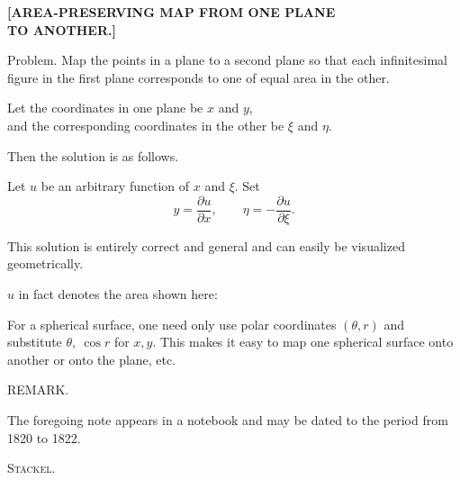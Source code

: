 \clearpage
{}%
\begin{center}\large\bfseries [AREA-PRESERVING MAP FROM ONE PLANE\\ TO ANOTHER.]\end{center}

Problem. Map the points in a plane to a second plane so that each infinitesimal figure in the first plane corresponds to one of equal area in the other.

Let the coordinates in one plane be $x$ and $y$,\\
\hspace*{1.6em}and the corresponding coordinates in the other be $\xi$ and $\eta$.

\noindent Then the  solution is as follows.

Let $u$ be an arbitrary function of $x$ and $\xi$. Set
\[
y=\frac{\partial u}{\partial x},\qquad \eta=-\frac{\partial u}{\partial\xi}.
\]

\indent This solution is entirely correct and general and can easily be visualized geometrically.

$u$ in fact denotes the area shown here:
\begin{center}\end{center}

For a spherical surface, one need only use polar coordinates $(\theta,r)$ and substitute $\theta,\ \cos r$ for $x,y$. This makes it easy to map one spherical surface onto another or onto the plane, etc.

\begin{center}REMARK.\end{center}

The foregoing note appears in a notebook and may be dated to the period from 1820 to 1822.
\begin{flushright}\textsc{Stäckel}.\end{flushright}
